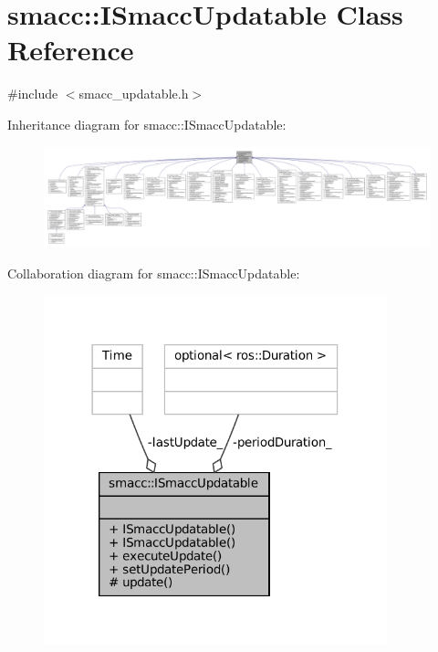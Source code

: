 \hypertarget{classsmacc_1_1ISmaccUpdatable}{}\section{smacc\+:\+:I\+Smacc\+Updatable Class Reference}
\label{classsmacc_1_1ISmaccUpdatable}


{\ttfamily \#include $<$smacc\+\_\+updatable.\+h$>$}



Inheritance diagram for smacc\+:\+:I\+Smacc\+Updatable\+:
\nopagebreak
\begin{figure}[H]
\begin{center}
\leavevmode
\includegraphics[width=350pt]{classsmacc_1_1ISmaccUpdatable__inherit__graph}
\end{center}
\end{figure}


Collaboration diagram for smacc\+:\+:I\+Smacc\+Updatable\+:
\nopagebreak
\begin{figure}[H]
\begin{center}
\leavevmode
\includegraphics[width=282pt]{classsmacc_1_1ISmaccUpdatable__coll__graph}
\end{center}
\end{figure}
